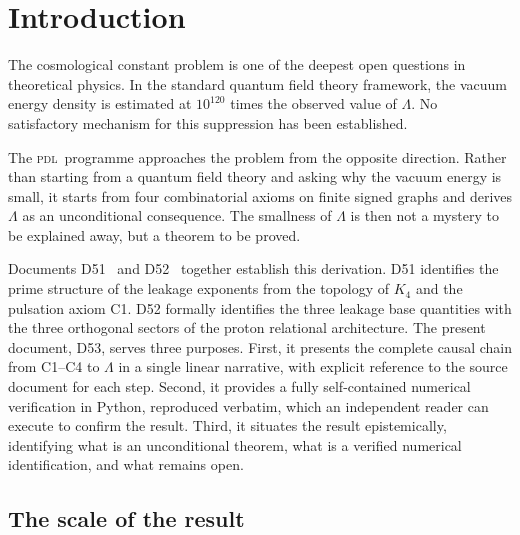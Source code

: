 \documentclass[12pt,a4paper]{article}
\theoremstyle{plain}
\theoremstyle{definition}
\theoremstyle{remark}
\newcommand{\Kfour}{K_4}
\newcommand{\PDL}{\textsc{pdl}}
\begin{document}
\section{Introduction}
\label{sec:intro}

The cosmological constant problem is one of the deepest open questions in theoretical physics. In the standard quantum field theory framework, the vacuum energy density is estimated at $10^{120}$ times the observed value of $\Lambda$. No satisfactory mechanism for this suppression has been established.

The \PDL\ programme approaches the problem from the opposite direction. Rather than starting from a quantum field theory and asking why the vacuum energy is small, it starts from four combinatorial axioms on finite signed graphs and derives $\Lambda$ as an unconditional consequence. The smallness of $\Lambda$ is then not a mystery to be explained away, but a theorem to be proved.

Documents D51~\cite{PDL_D51_2026} and D52~\cite{PDL_D52_2026} together establish this derivation. D51 identifies the prime structure of the leakage exponents from the topology of $\Kfour$ and the pulsation axiom C1. D52 formally identifies the three leakage base quantities with the three orthogonal sectors of the proton relational architecture. The present document, D53, serves three purposes. First, it presents the complete causal chain from C1--C4 to $\Lambda$ in a single linear narrative, with explicit reference to the source document for each step. Second, it provides a fully self-contained numerical verification in Python, reproduced verbatim, which an independent reader can execute to confirm the result. Third, it situates the result epistemically, identifying what is an unconditional theorem, what is a verified numerical identification, and what remains open.

\subsection{The scale of the result}
\label{subsec:scale}
\end{document}
